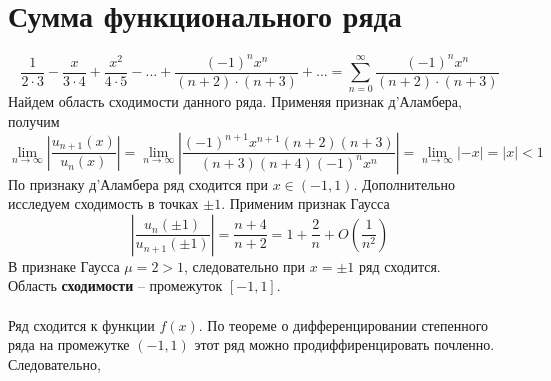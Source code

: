 \documentclass[a5paper, 10pt]{article}
\theoremstyle{definition}
\theoremstyle{plain}
\theoremstyle{remark}
\begin{document}
\section{Сумма функционального ряда}
\begin{equation*}
\frac{1}{2 \cdot 3} - \frac{x}{3 \cdot 4} + \frac{x^2}{4 \cdot 5} - ... + \frac{(-1)^n x^n}{(n+ 2) \cdot(n+ 3)} + ... = 
\sum  \limits_{n = 0}^{\infty} \frac{(-1)^n x^n}{(n+ 2) \cdot(n+ 3)}
\end{equation*}
Найдем область сходимости данного ряда. Применяя признак  д'Аламбера, получим
\begin{equation*}
\lim_{n \to \infty} \left| \frac{u_{n+1} (x)}{u_{n} (x)} \right| =
 \lim_{n \to \infty}  \left| \frac{(-1)^{n+1} x^{n+1}(n+ 2) (n+ 3)}{(n+ 3) (n+ 4) (-1)^n x^n} \right| = 
 \lim_{n \to \infty}  \left| - x \right| = \left|  x \right|  < 1
\end{equation*}
По признаку д'Аламбера ряд сходится при $ x \in (-1, 1)$. Дополнительно исследуем сходимость в точках $\pm 1$. Применим признак Гаусса
\begin{equation*}
 \left| \frac{u_{n} (\pm 1)}{u_{n+1} (\pm 1)} \right| = \frac{n+ 4}{n+ 2} = 1 + \frac{2}{n} + O\left(\frac{1}{n^2} \right)
\end{equation*}
В признаке Гаусса $\mu = 2 > 1$, следовательно при $x = \pm 1$ ряд сходится.\\
Область \textbf{сходимости} -- промежуток $[-1, 1]$.\\\\
Ряд сходится к функции $f(x)$. По теореме о дифференцировании степенного ряда на промежутке $ (-1, 1)$ этот ряд можно продиффиренцировать почленно. Следовательно,
\end{document}
